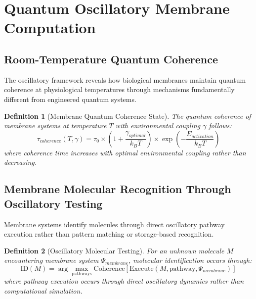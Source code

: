\documentclass[12pt,a4paper]{article}
\newtheorem{definition}{Definition}
\begin{document}
\section{Quantum Oscillatory Membrane Computation}

\subsection{Room-Temperature Quantum Coherence}

The oscillatory framework reveals how biological membranes maintain quantum coherence at physiological temperatures through mechanisms fundamentally different from engineered quantum systems.

\begin{definition}[Membrane Quantum Coherence State]
The quantum coherence of membrane systems at temperature $T$ with environmental coupling $\gamma$ follows:
\begin{equation}
\tau_{coherence}(T, \gamma) = \tau_0 \times \left(1 + \frac{\gamma_{optimal}}{k_B T}\right) \times \exp\left(-\frac{E_{activation}}{k_B T}\right)
\end{equation}
where coherence time increases with optimal environmental coupling rather than decreasing.
\end{definition}

\subsection{Membrane Molecular Recognition Through Oscillatory Testing}

Membrane systems identify molecules through direct oscillatory pathway execution rather than pattern matching or storage-based recognition.

\begin{definition}[Oscillatory Molecular Testing]
For an unknown molecule $M$ encountering membrane system $\Psi_{membrane}$, molecular identification occurs through:
\begin{equation}
\text{ID}(M) = \arg\max_{\text{pathways}} \text{Coherence}[\text{Execute}(M, \text{pathway}, \Psi_{membrane})]
\end{equation}
where pathway execution occurs through direct oscillatory dynamics rather than computational simulation.
\end{definition}
\end{document}
